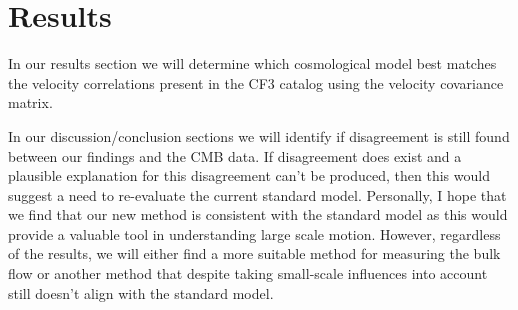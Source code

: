 \chapter{Results}
In our results section we will determine which cosmological model best matches the velocity correlations present in the CF3 catalog using the velocity covariance matrix.  

In our discussion/conclusion sections we will identify if disagreement is still found between our findings and the CMB data. If disagreement does exist and a plausible explanation for this disagreement can't be produced, then this would suggest a need to re-evaluate the current standard model. Personally, I hope that we find that our new method is consistent with the standard model as this would provide a valuable tool in understanding large scale motion. However, regardless of the results, we will either find a more suitable method for measuring the bulk flow or another method that despite taking small-scale influences into account still doesn't align with the standard model.